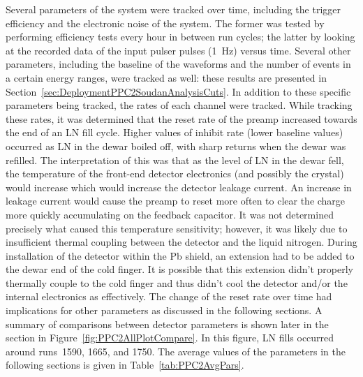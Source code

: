 	Several parameters of the system were tracked over time, including the trigger efficiency and the electronic noise of the system.  The former was tested by performing efficiency tests every hour in between run cycles; the latter by looking at the recorded data of the input pulser pulses (1~Hz) versus time.  Several other parameters, including the baseline of the waveforms and the number of events in a certain energy ranges, were tracked as well: these results are presented in Section~\ref{sec:DeploymentPPC2SoudanAnalysisCuts}.  In addition to these specific parameters being tracked, the rates of each channel were tracked.  While tracking these rates, it was determined that the reset rate of the preamp increased towards the end of an LN fill cycle.  Higher values of inhibit rate (lower baseline values) occurred as LN in the dewar boiled off, with sharp returns when the dewar was refilled.  The interpretation of this was that as the level of LN in the dewar fell, the temperature of the front-end detector electronics (and possibly the crystal) would increase which would increase the detector leakage current.  An increase in leakage current would cause the preamp to reset more often to clear the charge more quickly accumulating on the feedback capacitor.  It was not determined precisely what caused this temperature sensitivity; however, it was likely due to insufficient thermal coupling between the detector and the liquid nitrogen.  During installation of the detector within the Pb shield, an extension had to be added to the dewar end of the cold finger.  It is possible that this extension didn't properly thermally couple to the cold finger and thus didn't cool the detector and/or the internal electronics as effectively.  The change of the reset rate over time had implications for other parameters as discussed in the following sections.  A summary of comparisons between detector parameters is shown later in the section in Figure~\ref{fig:PPC2AllPlotCompare}.  In this figure, LN fills occurred around runs~1590, 1665, and 1750.  The average values of the parameters in the following sections is given in Table~\ref{tab:PPC2AvgPars}.
	




